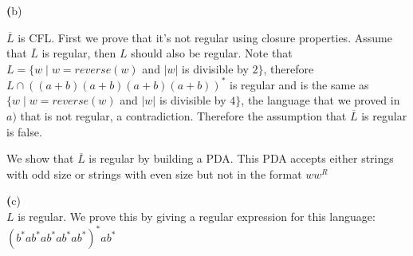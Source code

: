 \documentclass[11pt]{article}
\renewcommand{\part}[1] {{\vspace{0.15in}\noindent\textbf (#1)} \vspace{0.10in}}
\begin{document}
\part{b} \\
\par $\overline L$ is CFL. First we prove that it's not regular using closure properties. Assume that $\overline L$ is regular, then $L$ should also be regular. Note that $L = \{w \mid w = reverse (w)$ and $|w|$ is divisible by $2\}$, therefore $L \cap ((a+b)(a+b)(a+b)(a+b))^*$ is regular and is the same as $\{w \mid w = reverse (w)$ and $|w|$ is divisible by $4\}$, the language that we proved in $a)$ that is not regular, a contradiction. Therefore the assumption that $\overline L$ is regular is false.

\par We show that $\overline L$ is regular by building a PDA. This PDA accepts either strings with odd size or strings with even size but not in the format $ww^R$
\begin{figure}[h]
\centering
{}
\end{figure}



\part{c} \\
$L$ is regular. We prove this by giving a regular expression for this language: $(b^*ab^*ab^*ab^*ab^*)^*ab^*$
\end{document}
